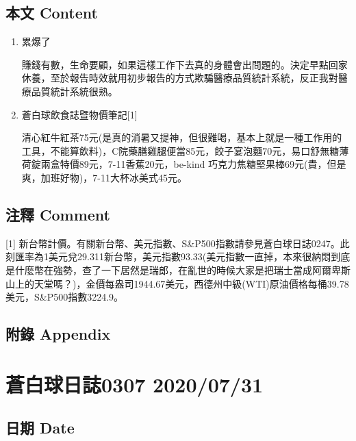 \documentclass[
]{article}
\begin{document}
\hypertarget{ux672cux6587-content-29}{%
\subsection{本文 Content}\label{ux672cux6587-content-29}}

\begin{enumerate}
\def\labelenumi{\arabic{enumi}.}
\item
  累爆了

  賺錢有數，生命要顧，如果這樣工作下去真的身體會出問題的。決定早點回家休養，至於報告時效就用初步報告的方式欺騙醫療品質統計系統，反正我對醫療品質統計系統很熟。
\item
  蒼白球飲食誌暨物價筆記{[}1{]}

  清心紅牛紅茶75元(是真的消暑又提神，但很難喝，基本上就是一種工作用的工具，不能算飲料)，C院藥膳雞腿便當85元，餃子宴泡麵70元，易口舒無糖薄荷錠兩盒特價89元，7-11香蕉20元，be-kind
  巧克力焦糖堅果棒69元(貴，但是爽，加班好物)，7-11大杯冰美式45元。
\end{enumerate}

\hypertarget{ux6ce8ux91cb-comment-29}{%
\subsection{注釋 Comment}\label{ux6ce8ux91cb-comment-29}}

{[}1{]}
新台幣計價。有關新台幣、美元指數、S\&P500指數請參見蒼白球日誌0247。此刻匯率為1美元兌29.311新台幣，美元指數93.33(美元指數一直掉，本來很納悶到底是什麼幣在強勢，查了一下居然是瑞郎，在亂世的時候大家是把瑞士當成阿爾卑斯山上的天堂嗎？)，金價每盎司1944.67美元，西德州中級(WTI)原油價格每桶39.78美元，S\&P500指數3224.9。

\hypertarget{ux9644ux9304-appendix-29}{%
\subsection{附錄 Appendix}\label{ux9644ux9304-appendix-29}}

\hypertarget{ux84bcux767dux7403ux65e5ux8a8c0307-20200731}{%
\section{蒼白球日誌0307
2020/07/31}\label{ux84bcux767dux7403ux65e5ux8a8c0307-20200731}}

\hypertarget{ux65e5ux671f-date-30}{%
\subsection{日期 Date}\label{ux65e5ux671f-date-30}}
\end{document}
